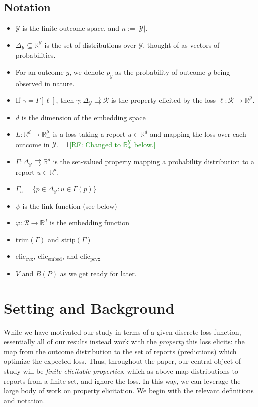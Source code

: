 \documentclass[anon,12pt]{colt2019}
\newcommand{\Comments}{1}
\newcommand{\mynote}[2]{\ifnum\Comments=1\textcolor{#1}{#2}\fi}
\newcommand{\raf}[1]{\mynote{green}{[RF: #1]}}
\newcommand{\reals}{\mathbb{R}}
\newcommand{\prop}[1]{\Gamma[#1]}
\newcommand{\eliccvx}{\mathrm{elic}_\mathrm{cvx}}
\newcommand{\elicpoly}{\mathrm{elic}_\mathrm{pcvx}}
\newcommand{\elicembed}{\mathrm{elic}_\mathrm{embed}}
\newcommand{\simplex}{\Delta_\Y}
\newcommand{\R}{\mathcal{R}}
\newcommand{\Y}{\mathcal{Y}}
\newcommand{\toto}{\rightrightarrows}
\newcommand{\strip}{\mathrm{strip}}
\newcommand{\trim}{\mathrm{trim}}
\begin{document}
\subsection{Notation}
\begin{itemize}
  \item $\Y$ is the finite outcome space, and $n := |\Y|$.
  \item $\simplex\subseteq\reals^\Y$ is the set of distributions over $\Y$, thought of as vectors of probabilities.
  \item For an outcome $y$, we denote $p_y$ as the probability of outcome $y$ being observed in nature.
  \item If $\gamma = \prop{\ell}$, then $\gamma:\simplex \toto \R$ is the property elicited by the loss $\ell: \R \to \reals^\Y$.
  \item $d$ is the dimension of the embedding space
  \item $L:\reals^d \to \reals^\Y_+$ is a loss taking a report $u \in \reals^d$ and mapping the loss over each outcome in $\Y$. \raf{Changed to $\reals^\Y_+$ below.}
  \item $\Gamma: \simplex \toto \reals^d$ is the set-valued property mapping a probability distribution to a report $u \in \reals^d$.
  \item $\Gamma_u = \{ p \in \simplex : u \in \Gamma(p) \}$
  \item $\psi$ is the link function (see below)
  \item $\varphi:\R \to \reals^d$ is the embedding function
  \item $\trim(\Gamma)$ and $\strip(\Gamma)$
  \item $\eliccvx$, $\elicembed$, and $\elicpoly$
  \item $V$ and $B(P)$ as we get ready for later.
\end{itemize}

\section{Setting and Background}

While we have motivated our study in terms of a given discrete loss function, essentially all of our results instead work with the \emph{property} this loss elicits: the map from the outcome distribution to the set of reports (predictions) which optimize the expected loss.
Thus, throughout the paper, our central object of study will be \emph{finite elicitable properties}, which as above map distributions to reports from a finite set, and ignore the loss.
In this way, we can leverage the large body of work on property elicitation.
We begin with the relevant definitions and notation.
\end{document}
